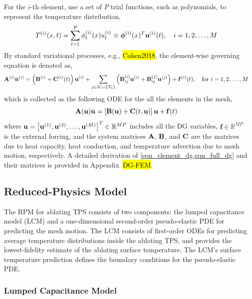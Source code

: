 For the $i$-th element, use a set of $P$ trial functions, such as polynomials, to represent the temperature distribution,
\begin{equation}
    T^{(i)}(x,t) = \sum_{l=1}^{P} \phi_l^{(i)}(x)u_l^{(i)} \equiv \boldsymbol{\phi}^{(i)}(x)^T\mathbf{u}^{(i)}(t),\quad i=1,2,\dots,M\label{eqn_element_temperature}
\end{equation}
By standard variational processes, e.g., \hl{Cohen2018}, the element-wise governing equation is denoted as,
\begin{equation}
    \mathbf{A}^{(i)}\dot{\mathbf{u}}^{(i)} = \left(\mathbf{B}^{(i)} + \mathbf{C}^{(i)}(t)\right)\mathbf{u}^{(i)} + \sum_{j\in\mathcal{N}_i\cup\left\{T_b\right\}}\left(\mathbf{B}^{(i)}_{ij}\mathbf{u}^{(i)} + \mathbf{B}^{(j)}_{ij}\mathbf{u}^{(j)}\right) + \mathbf{f}^{(i)}(t),\quad\text{for }i=1,2,\dots,M\label{eqn_element_dg}
\end{equation}
which is collected as the following ODE for the all the elements in the mesh,
\begin{equation}
    \mathbf{A}(\mathbf{u})\dot{\mathbf{u}} = \left[\mathbf{B}(\mathbf{u}) + \mathbf{C}(t,\mathbf{u})\right]\mathbf{u} + \mathbf{f}(t)\label{eqn_full_dg}
\end{equation}
where $\mathbf{u} = \left[\mathbf{u}^{(1)}, \mathbf{u}^{(2)}, \ldots, \mathbf{u}^{(M)}\right]^T\in\mathbb{R}^{MP}$ includes all the DG variables, $\mathbf{f}\in\mathbb{R}^{MP}$ is the external forcing, and the system matrices $\mathbf{A}$, $\mathbf{B}$, and $\mathbf{C}$ are the matrices due to heat capacity, heat conduction, and temperature advection due to mesh motion, respectively. A detailed derivation of \cref{eqn_element_dg,eqn_full_dg} and their matrices is provided in Appendix~\hl{DG-FEM}.

\subsection{Reduced-Physics Model}

The RPM for ablating TPS consists of two components: the lumped capacitance model (LCM) and a one-dimensional second-order pseudo-elastic PDE for predicting the mesh motion. The LCM consists of first-order ODEs for predicting average temperature distributions inside the ablating TPS, and provides the lowest-fidelity estimate of the ablating surface temperature. The LCM's surface temperature prediction defines the boundary conditions for the pseudo-elastic PDE.

\subsubsection{Lumped Capacitance Model}


